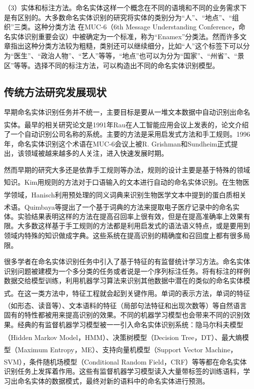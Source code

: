 \documentclass[winfonts,master,oneside,nobackinfo]{njuthesis}
\newcommand{\upcite}[1]{\textsuperscript{\textsuperscript{\cite{#1}}}}
\begin{document}
（3）实体和标注方法。命名实体这样一个概念在不同的语境和不同的业务需求下是有区别的。大多数命名实体识别的研究将实体的类别分为“人”、“地点”、“组织”三类。这种分类方法 在MUC-6（6th Message Understanding Conference，命名实体识别重要会议）中被确定为一个标准，称为“Enamex”分类法。然而许多文章指出这种分类方法较为粗糙，类别还可以继续细分，比如“人”这个标签下可以分为“医生”、“政治人物”、“艺人”等等，“地点”也可以为分为“国家”、“州省”、“景区”等等。选择不同的标注方法，可以构造出不同的命名实体识别模型。

\subsection{传统方法研究发展现状}
早期命名实体识别任务并不统一，主要目标是要从一堆文本数据中自动识别出命名实体。最早的相关研究论文是1991年Rau\upcite{Rau}在人工智能应用会议上发表的，论文介绍了一个自动识别公司名称的系统。主要的方法是采用启发式方法和手工规则。1996年，命名实体识别这个术语在MUC-6会议上被R. Grishman和Sundheim正式提出，该领域被越来越多的人关注，进入快速发展时期。

然而早期的研究大多还是依靠手工规则等办法，规则的设计主要是基于特殊的领域知识。Kim\upcite{Kim}用规则的方法对于口语输入的文本进行自动的命名实体识别。在生物医学领域，Hanisch\upcite{Hanisch}利用预处理的同义词典来识别生物医学文本中提到的蛋白质相关术语。Quimbaya等\upcite{Quimbaya}提出了一个基于词典的方法来提取电子医疗记录中的命名实体。实验结果表明这样的方法在提高召回率上很有效，但是在提高准确率上效果有限。大多数这样基于手工规则的方法都是利用启发式的语法语义特点，或是要用到领域内特殊的知识做成字典。这些系统在提高识别的精确度和召回度上都有很多局限。

很多学者在命名实体识别任务中引入了基于特征的有监督统计学习方法。命名实体识别问题被建模为一个多分类的任务或者说是一个序列标注任务。将有标注的样例数据交给模型训练，利用机器学习算法来识别其他数据中潜在的类似的命名实体模式。在这一类方法中，特征工程就会起到关键作用。单词的表示方法\upcite{Nadeau}，单词的特征（如形态、读音等）\upcite{Settles}、文本语料的特征（局部句法特征和出现次数等）\upcite{Ravin}等自然语言固有的特性都被用来提高识别的效果。不同的机器学习模型也会带来不同的识别效果。经典的有监督机器学习模型被一一引入命名实体识别系统：隐马尔科夫模型（Hidden Markov Model，HMM）\upcite{Eddy}、决策树模型（Decision Tree，DT）\upcite{Quinlan}、最大熵模型（Maximum Entropy，ME）\upcite{Kapur}、支持向量机模型（Support Vector Machine，SVM）\upcite{Hearst}，条件随机场模型（Conditional Random Field，CRF）\upcite{Lafferty}等等都在命名实体识别任务上发挥着作用。这些有监督机器学习模型读入大量带标签的训练语料，学习出命名实体的数据模式，最终对新的语料中的命名实体进行预测。
\end{document}
